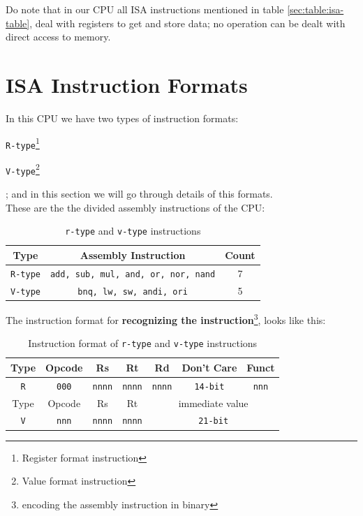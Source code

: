 \documentclass[12pt, dvipsnames, svgnames, x11names, oneside]{book}
\begin{document}
				Do note that in our CPU all ISA instructions mentioned in table \ref{sec:table:isa-table}, deal with registers to get and store data; no operation can be dealt with direct access to memory.
		
		\section{ISA Instruction Formats}\label{sec:isa-insts}
		In this CPU we have two types of instruction formats: 
		\begin{enumerate*}
			\item \texttt{R-type}\footnote{Register format instruction}
			\item \texttt{V-type}\footnote{Value format instruction}
		\end{enumerate*}; and in this section we will go through details of this formats. \\
		
		These are the the divided assembly instructions of the CPU:
		\begin{table}[h]
			\caption{\texttt{r-type} and \texttt{v-type} instructions}
			\begin{center}
				\begin{tabular}{|c|c|c|}
					\hline
					Type & Assembly Instruction & Count \\
					\hline
					\hline
					\texttt{R-type} & \texttt{add, sub, mul, and, or, nor, nand} & 7 \\
					\hline
					\texttt{V-type} & \texttt{bnq, lw, sw, andi, ori} & 5 \\
					\hline
				\end{tabular}
			\end{center}
		\end{table}\label{sec:table:isa-insts}
		
		The instruction format for \textbf{recognizing the instruction}\footnote{encoding the assembly instruction in binary}, looks like this:
		
		\begin{table}[h]
			\caption{Instruction format of \texttt{r-type} and \texttt{v-type} instructions}
			\begin{center}
				\begin{tabular}{|c|c|c|c|c|c|c|}
					\hline
					Type & Opcode & Rs & Rt & Rd & Don't Care & Funct \\
					\hline
					\texttt{R} & \texttt{000} & \texttt{nnnn} & \texttt{nnnn} & \texttt{nnnn} & \texttt{14-bit} & \texttt{nnn} \\
					\hline
					\hline
					Type & Opcode & Rs & Rt & \multicolumn{3}{|c|}{immediate value} \\ \hline
					\texttt{V} & \texttt{nnn} & \texttt{nnnn} & \texttt{nnnn} & \multicolumn{3}{|c|}{\texttt{21-bit}} \\
					\hline
				\end{tabular}
			\end{center}
		\end{table}
		
\end{document}

